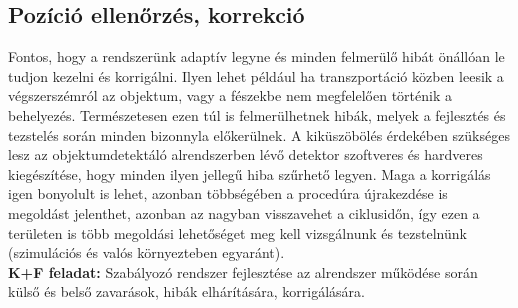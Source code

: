 \documentclass{article}
\begin{document}
\subsection{Pozíció ellenőrzés, korrekció}
Fontos, hogy a rendszerünk adaptív legyne és minden felmerülő hibát önállóan le
tudjon kezelni és korrigálni. Ilyen lehet például ha transzportáció közben leesik a végszerszémról
az objektum, vagy a fészekbe nem megfelelően történik a behelyezés. Természetesen ezen túl is
felmerülhetnek hibák, melyek a fejlesztés és tezstelés során minden bizonnyla előkerülnek.
A kiküszöbölés érdekében szükséges lesz az objektumdetektáló alrendszerben lévő detektor 
szoftveres és hardveres kiegészítése, hogy minden ilyen jellegű hiba szűrhető legyen. 
Maga a korrigálás igen bonyolult is lehet, azonban többségében a procedúra újrakezdése is
megoldást jelenthet, azonban az nagyban visszavehet a ciklusidőn, így ezen a területen is
több megoldási lehetőséget meg kell vizsgálnunk és tezstelnünk (szimulációs és valós környezteben egyaránt).\vspace{5pt}\\
\textbf{K+F feladat: }Szabályozó rendszer fejlesztése az alrendszer működése során külső és belső zavarások, hibák elhárítására, korrigálására.
\end{document}
